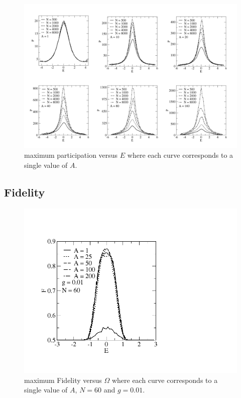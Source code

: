 \documentclass{comjnl}
\begin{document}
\begin{figure}[!htbp]
  \centering
  \includegraphics[width=\linewidth]{PE.png}
  \caption{maximum participation versus $E$ where each curve corresponds to a single value of $A$.}
\end{figure}

\subsection{Fidelity}

\begin{figure}[ht]
  \centering
  \includegraphics[width= \linewidth]{fidelidade.png}
  \caption{maximum Fidelity versus $\Omega$ where each curve corresponds to a single value of $A$, $N = 60$ and $g = 0.01$.}
\end{figure}
\end{document}
